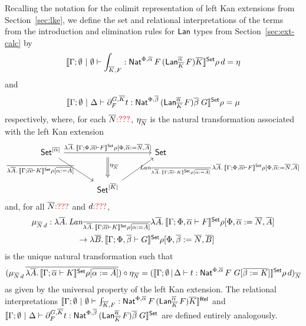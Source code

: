 \documentclass{lmcs}
\theoremstyle{plain}\newtheorem{satz}[thm]{Satz}
\newcommand{\set}{\mathsf{Set}}
\begin{document}
Recalling the notation for the colimit representation of left Kan
extensions from Section~\ref{sec:lke}, we define the set and
relational interpretations of the terms from the introduction and
elimination rules for $\mathsf{Lan}$ types from Section~\ref{sec:ext-calc} by 
\[
\setsem{\Gamma;\emptyset~|~\emptyset \vdash \int_{\ol K,F}
: \Nat^{\Phi, \ol\alpha}\, F\, (\Lan^{\ol\alpha}_{\ol{K}}\,  F) \ol{K}}\rho\,d
= \eta
\]
and
\[
\setsem{\Gamma;\emptyset~|~\Delta \vdash \partial^{G, \ol K}_F t 
: \Nat^{\Phi, \ol\beta}\, (\Lan^{\ol\alpha}_{\ol K}\,F) \ol \beta\; G}\rho
= \mu
\]
respectively, where, for each $\overline{N} {\color{red} : ???}$,
$\eta_{\overline{N}}$ is the natural transformation associated with the left
Kan extension
\[\begin{tikzcd} [column sep = large, row sep = large]
\set^{|\ol \alpha|}
\ar[rr, "\lambda \ol{A}.\,\setsem{\Gamma; \Phi, \ol\alpha
    \vdash F}\rho {[\Phi, \ol \alpha := \ol{N}, \ol{A} ]}"{name=F}] 
\ar[dr, "\ol{\lambda \ol{A}.\,\setsem{\Gamma; \ol\alpha \vdash
      K}\rho {[\ol{\alpha := A} ]}}"{left}] && \set \\  
&\set^{|\ol K|} \ar[ur, "\mathit{Lan}_{\ol{\lambda \ol A.\,
      \setsem{\Gamma; \ol\alpha \vdash K}\rho {[\ol{\alpha := A}
  ]}}}\, \lambda \ol A.\, \setsem{\Gamma; \Phi, \ol\alpha \vdash
    F}\rho {[\Phi, \ol \alpha :=  \ol N, \ol A ]}"{right}]
\ar[d, Rightarrow, shorten <= 2mm, shorten >= 1mm, 
          from=F, to=2-2,  "\eta_{\ol{N}}"{}]
\end{tikzcd}\]
and, for all $\overline{N} {\color{red} : ???}$ and $d {\color{red} : ???}$,
\[\begin{array}{l}
\mu_{\ol{N}\, d} : \lambda \ol{A}.\,
\mathit{Lan}_{\ol{\lambda \ol A.\,\setsem{\Gamma; \ol\alpha \vdash K}\rho 
  {[\ol{\alpha := A} ]}}} \lambda \ol A.\,\setsem{\Gamma; \Phi,
  \ol\alpha \vdash F}\rho {[\Phi, \ol \alpha := \ol N, \ol A ]}\\[2ex]
\hspace*{0.8in}\to \lambda \ol B.\, \setsem{\Gamma; 
  \Phi, \ol\beta \vdash G} \rho[\Phi, \ol \beta := \ol N, \ol B]
\end{array}\]
is the unique natural transformation such that
\begin{equation}\label{eq:defn-of-mu-sub-N}
(\mu_{\ol{N}\, d} \, \ol{\lambda \ol A.\,\setsem{\Gamma; \ol\alpha \vdash K}
  \rho[\ol{\alpha := A}]}) \circ \eta_{\ol{N}}
= (\setsem{\Gamma; \emptyset \,|\, \Delta \vdash t : \Nat^{\Phi,
  \ol\alpha} \, F \,\, G[\ol{\beta := K}]}\rho \, d)_{\ol{N}}
\end{equation}
as given by the universal property of the left Kan extension.  The
relational interpretations $\llbracket{\Gamma;\emptyset~|~\emptyset
  \vdash \int_{\overline{K},F} : \mathsf{Nat}^{\Phi, \overline{\alpha}}\, F\,
  (\mathsf{Lan}^{\overline{\alpha}}_{\overline{K}}\, F) \overline{K}}\rrbracket^{\mathsf{Rel}}$ and
$\setsem{\Gamma;\emptyset~|~\Delta \vdash \partial^{G, \ol K}_F t :
  \Nat^{\Phi, \ol\beta}\, (\Lan^{\ol\alpha}_{\ol K}\,F) \ol \beta\;
  G}$ are defined entirely analogously.
\end{document}
